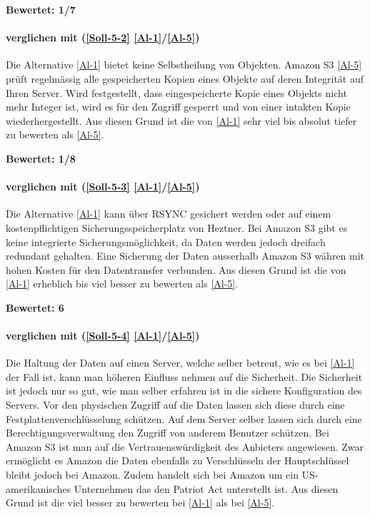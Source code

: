 \textbf{Bewertet: 1/7}


\paragraph*{  verglichen mit  (\ref{Soll-5-2} \ref{Al-1}/\ref{Al-5})} 
Die Alternative \ref{Al-1} bietet keine Selbstheilung von Objekten. Amazon S3 \ref{Al-5} prüft regelmässig alle gespeicherten Kopien eines Objekte auf deren Integrität auf Ihren Server. Wird festgestellt, dass eingespeicherte Kopie eines Objekts nicht mehr Integer ist, wird es für den Zugriff gesperrt und von einer intakten Kopie wiederhergestellt. Aus diesen Grund ist die  von \ref{Al-1} sehr viel bis absolut tiefer zu bewerten als \ref{Al-5}.

\textbf{Bewertet: 1/8}

\paragraph*{  verglichen mit  (\ref{Soll-5-3} \ref{Al-1}/\ref{Al-5})} 
Die Alternative \ref{Al-1} kann über RSYNC gesichert werden oder auf einem kostenpflichtigen Sicherungsspeicherplatz von Heztner. Bei Amazon S3 gibt es keine integrierte Sicherungsmöglichkeit, da Daten werden jedoch dreifach redundant gehalten. Eine Sicherung der Daten ausserhalb Amazon S3 währen mit hohen Kosten für den Datentransfer verbunden. Aus diesen Grund ist die  von \ref{Al-1} erheblich bis viel besser zu bewerten als \ref{Al-5}.

\textbf{Bewertet: 6}

\paragraph*{  verglichen mit  (\ref{Soll-5-4} \ref{Al-1}/\ref{Al-5})} 
Die Haltung der Daten auf einen Server, welche selber betreut, wie es bei \ref{Al-1} der Fall ist, kann man höheren Einfluss nehmen auf die Sicherheit. Die Sicherheit ist jedoch nur so gut, wie man selber erfahren ist in die sichere Konfiguration des Servers. Vor den physischen Zugriff auf die Daten lassen sich diese durch eine Festplattenverschlüsselung schützen. Auf dem Server selber lassen sich durch eine Berechtigungsverwaltung den Zugriff von anderem Benutzer schützen. Bei Amazon S3 ist man auf die Vertrauenswürdigkeit des Anbieters angewiesen. Zwar ermöglicht es Amazon die Daten ebenfalls zu Verschlüsseln der Hauptschlüssel bleibt jedoch bei Amazon. Zudem handelt sich bei Amazon um ein US-amerikanisches Unternehmen das den Patriot Act unterstellt ist.
Aus diesen Grund ist die  viel besser zu bewerten bei \ref{Al-1} als bei \ref{Al-5}.

